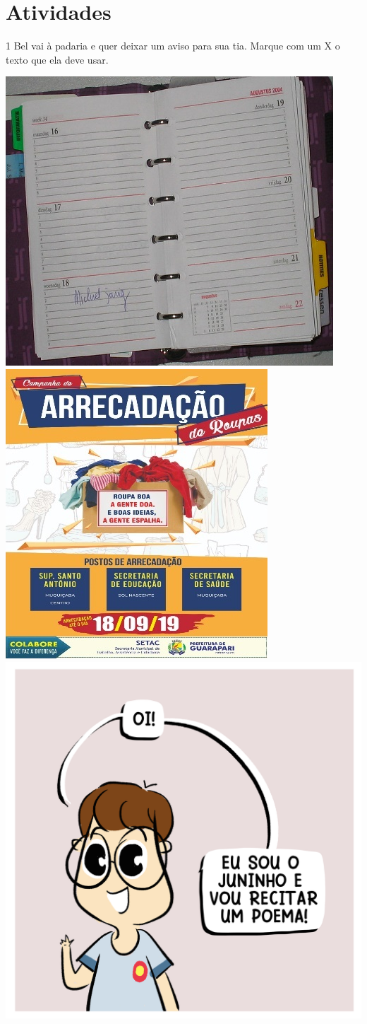 
\section*{Atividades}

\num{1} Bel vai à padaria e quer deixar um aviso para sua tia. 
Marque com um X o texto que ela deve usar.


\includegraphics[width=.3\textwidth]{media/image93.jpeg}
\includegraphics[width=.3\textwidth]{media/image94.jpeg}
\includegraphics[width=.3\textwidth]{media/image97.png}



